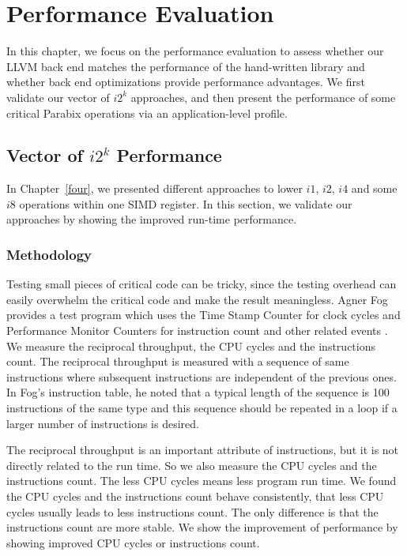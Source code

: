 %
%

\chapter{Performance Evaluation}
\label{six}

In this chapter, we focus on the performance evaluation to assess whether our LLVM back end matches the performance of the hand-written library and whether back end optimizations provide performance advantages. We first validate our vector of $i2^k$ approaches, and then present the performance of some critical Parabix operations via an application-level profile.

\section{Vector of $i2^k$ Performance}
In Chapter~\ref{four}, we presented different approaches to lower $i1$, $i2$, $i4$ and some $i8$ operations within one SIMD register. In this section, we validate our approaches by showing the improved run-time performance.

\subsection{Methodology}

Testing small pieces of critical code can be tricky, since the testing overhead can easily overwhelm the critical code and make the result meaningless. Agner Fog provides a test program which uses the Time Stamp Counter for clock cycles and Performance Monitor Counters for instruction count and other related events \cite{agner_testp}. We measure the reciprocal throughput, the CPU cycles and the instructions count. The reciprocal throughput is measured with a sequence of same instructions where subsequent instructions are independent of the previous ones. In Fog's instruction table, he noted that a typical length of the sequence is 100 instructions of the same type and this sequence should be repeated in a loop if a larger number of instructions is desired.

The reciprocal throughput is an important attribute of instructions, but it is not directly related to the run time. So we also measure the CPU cycles and the instructions count. The less CPU cycles means less program run time. We found the CPU cycles and the instructions count behave consistently, that less CPU cycles usually leads to less instructions count. The only difference is that the instructions count are more stable. We show the improvement of performance by showing improved CPU cycles or instructions count.

